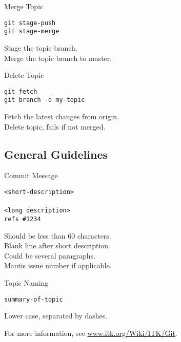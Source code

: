 \documentclass[10pt]{article}
\newlength{\cvsep}
\newlength{\cvtitles}
\newlength{\cvmain}
\newenvironment{category}[1]
  {\parbox[t]{\cvtitles}{\large\sc\centering #1}\hspace*{\cvsep}\begin{minipage}[t]{\cvmain}}
  {\end{minipage}\vspace*{0.35cm}}
\begin{document}
\begin{category}{Merge Topic}
\parbox[t]{0.6\cvmain}{%
  \texttt{git stage-push\\ git stage-merge}
}
\parbox[t]{0.38\cvmain}{%
Stage the topic branch.\\
Merge the topic branch to master.
}
\end{category}
\begin{category}{Delete Topic}
\parbox[t]{0.6\cvmain}{%
  \texttt{git fetch\\ git branch -d my-topic}
}
\parbox[t]{0.38\cvmain}{%
Fetch the latest changes from origin.\\
Delete topic, fails if not merged.
}
\end{category}

\subsection*{General Guidelines}
\begin{category}{Commit Message}
\parbox[t]{0.6\cvmain}{%
  \texttt{<short-description>\\ \\ <long description>\\ refs \#1234}
}
\parbox[t]{0.38\cvmain}{%
Should be less than 60 characters.\\
Blank line after short description.\\
Could be several paragraphs.\\
Mantis issue number if applicable.
}
\end{category}
\begin{category}{Topic Naming}
\parbox[t]{0.6\cvmain}{%
  \texttt{summary-of-topic}
}
\parbox[t]{0.38\cvmain}{%
Lower case, separated by dashes.
}
\end{category}


\begin{center}
For more information, see \href{http://www.itk.org/Wiki/ITK/Git}{www.itk.org/Wiki/ITK/Git}.
\end{center}
\end{document}
